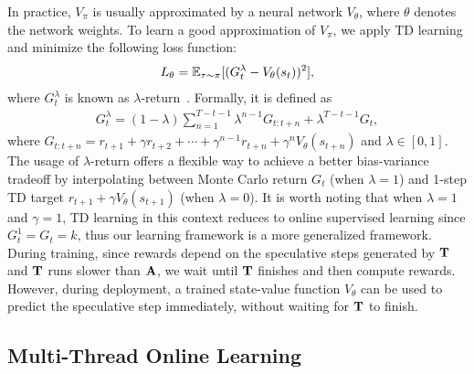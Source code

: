 In practice, $V_{\pi}$ is usually approximated by a neural network $V_{\theta}$, where $\theta$ denotes the network weights.
To learn a good approximation of $V_{\pi}$, we apply TD learning and minimize the following loss function:
\begin{align}\label{eq:td_loss}
L_{\theta} = \mathbb{E}_{\tau \sim \pi} [(G_t^\lambda - V_{\theta}(s_t))^2],
\end{align}
where $G_t^\lambda$ is known as $\lambda$-return~\citep{sutton2018reinforcement}.
Formally, it is defined as
\begin{align}
G_t^\lambda = (1-\lambda) \sum_{n=1}^{T-t-1} \lambda^{n-1} G_{t: t+n} + \lambda^{T-t-1} G_t,
\end{align}
where $G_{t: t+n} = r_{t+1} + \gamma r_{t+2} + \cdots + \gamma^{n-1} r_{t+n}+\gamma^n V_{\theta}(s_{t+n})$ and $\lambda \in [0,1]$.
The usage of $\lambda$-return offers a flexible way to achieve a better bias-variance tradeoff by interpolating between Monte Carlo return $G_t$ (when $\lambda=1$) and 1-step TD target $r_{t+1} + \gamma V_{\theta}(s_{t+1})$ (when $\lambda=0$).
It is worth noting that when $\lambda=1$ and $\gamma=1$, TD learning in this context reduces to online supervised learning since $G_t^1 = G_t = k$, thus our learning framework is a more generalized framework.
During training, since rewards depend on the speculative steps generated by ${\mathbf{T}}$ and ${\mathbf{T}}$ runs slower than ${\mathbf{A}}$, we wait until ${\mathbf{T}}$ finishes and then compute rewards.
However, during deployment, a trained state-value function $V_{\theta}$ can be used to predict the speculative step immediately, without waiting for ${\mathbf{T}}$ to finish.


\subsection{Multi-Thread Online Learning}

